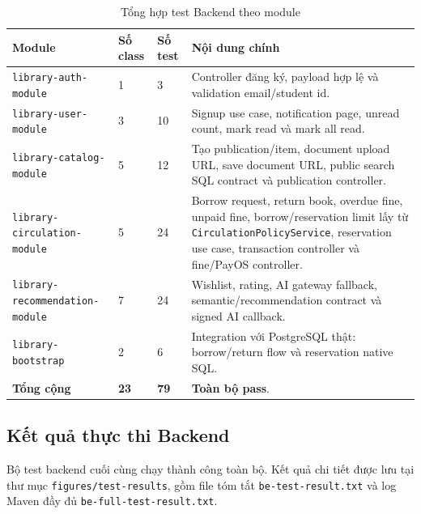 \begin{table}[H]
\centering
\small
\begin{tabularx}{\textwidth}{|p{4.2cm}|p{2.2cm}|p{2cm}|X|}
\hline
\textbf{Module} & \textbf{Số class} & \textbf{Số test} & \textbf{Nội dung chính} \\
\hline
\texttt{library-auth-module} & 1 & 3 & Controller đăng ký, payload hợp lệ và validation email/student id. \\
\hline
\texttt{library-user-module} & 3 & 10 & Signup use case, notification page, unread count, mark read và mark all read. \\
\hline
\texttt{library-catalog-module} & 5 & 12 & Tạo publication/item, document upload URL, save document URL, public search SQL contract và publication controller. \\
\hline
\texttt{library-circulation-module} & 5 & 24 & Borrow request, return book, overdue fine, unpaid fine, borrow/reservation limit lấy từ \texttt{CirculationPolicyService}, reservation use case, transaction controller và fine/PayOS controller. \\
\hline
\texttt{library-recommendation-module} & 7 & 24 & Wishlist, rating, AI gateway fallback, semantic/recommendation contract và signed AI callback. \\
\hline
\texttt{library-bootstrap} & 2 & 6 & Integration với PostgreSQL thật: borrow/return flow và reservation native SQL. \\
\hline
\textbf{Tổng cộng} & \textbf{23} & \textbf{79} & \textbf{Toàn bộ pass}. \\
\hline
\end{tabularx}
\caption{Tổng hợp test Backend theo module}
\label{tab:be_test_modules}
\end{table}

\subsection{Kết quả thực thi Backend}

Bộ test backend cuối cùng chạy thành công toàn bộ. Kết quả chi tiết được lưu tại
thư mục \texttt{figures/test-results}, gồm file tóm tắt
\texttt{be-test-result.txt} và log Maven đầy đủ
\texttt{be-full-test-result.txt}.

